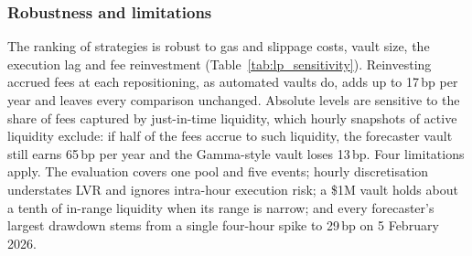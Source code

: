 \begin{table}[pos=!htbp,align=\centering]
\centering
\caption{Tail-based vault strategies across forecasters. ES band: asymmetric range from the
5\% expected shortfall over six hours, $\kappa=0.5$. ES-filtered gate: classifier alerts kept
only while the 24-hour ES lies more than 10\,bp from the current price; the alert share is the
fraction of hours frozen. Values in basis points of a \$1M vault.}
\label{tab:lp_es}
\end{table}

\subsubsection{Robustness and limitations}

The ranking of strategies is robust to gas and slippage costs, vault size, the execution lag
and fee reinvestment (Table~\ref{tab:lp_sensitivity}). Reinvesting accrued fees at each
repositioning, as automated vaults do, adds up to 17\,bp per year and leaves every comparison
unchanged. Absolute levels are sensitive to the share of fees captured by just-in-time
liquidity, which hourly snapshots of active liquidity exclude: if half of the fees accrue to
such liquidity, the forecaster vault still earns 65\,bp per year and the Gamma-style vault
loses 13\,bp. Four limitations apply. The evaluation covers one pool and five events; hourly
discretisation understates LVR and ignores intra-hour execution risk; a \$1M vault holds
about a tenth of in-range liquidity when its range is narrow; and every forecaster's largest
drawdown stems from a single four-hour spike to 29\,bp on 5 February 2026.


